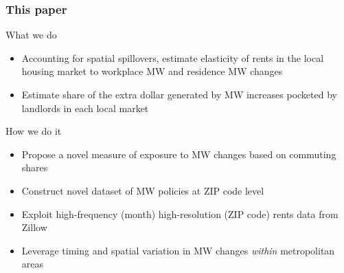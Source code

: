 \documentclass[aspectratio=169, t]{beamer}
\begin{document}
\begin{frame}
    \frametitle{This paper}
    
    What we do
    \begin{itemize}
        \vspace{.5mm} \item Accounting for spatial spillovers, estimate 
        elasticity of rents in the local housing market to
         {\color{blue} workplace MW} and {\color{red} residence MW} changes
        \vspace{.5mm} \item Estimate share of the extra dollar generated by
        MW increases pocketed by landlords in each local market
    \end{itemize}
    
    \vspace{3mm}
    \pause
    How we do it
    \begin{itemize}
        \vspace{.5mm} \item Propose a novel measure of exposure to MW changes 
        based on commuting shares
        \vspace{.5mm} \item Construct novel dataset of MW policies at ZIP code level
        \vspace{.5mm} \item Exploit high-frequency (month) high-resolution 
        (ZIP code) rents data from Zillow
        \vspace{.5mm} \item Leverage timing and spatial variation in MW changes 
        \textit{within} metropolitan areas
    \end{itemize}
\end{frame}
\end{document}
